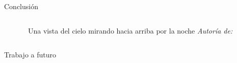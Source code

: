 \begin{frame}{Conclusión}
\begin{columns}
\begin{column}{0.4\textwidth}
\begin{figure}[H]
{                }
                \vspace{-0.25cm}
                \caption{\tiny~Una vista del cielo mirando hacia arriba por la noche \textit{Autoría de:}~\cite{dyer_cielo_nocturno_2021}}%
                \label{fig:Matplotlib_logo}
            \end{figure}
        \end{column}
    \end{columns}
\end{frame}

\begin{frame}{Trabajo a futuro}
    \begin{columns}
        \begin{column}{0.4\textwidth}
            \centering
            \begin{figure}[H]
                \centering
\end{figure}
\end{column}
\end{columns}
\end{frame}
